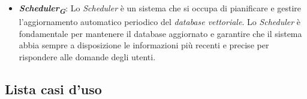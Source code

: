 \begin{itemize}
    \item \textbf{\emph{Scheduler}\textsubscript{\textbf{\textit{G}}}}: Lo \emph{Scheduler} è un sistema che si occupa di pianificare e gestire l'aggiornamento automatico periodico del \emph{database vettoriale}. Lo \emph{Scheduler} è fondamentale per mantenere il database aggiornato e garantire che il sistema abbia sempre a disposizione le informazioni più recenti e precise per rispondere alle domande degli utenti.

\end{itemize}


\subsection{Lista casi d'uso}





\begin{comment}
\hypertarget{UC0}{}
\subsubsection{UC0: \dots}

\begin{figure}[h]
    \centering
    \texttt{[image: placeholder.png]}
    \caption{\dots}
\end{figure}

\begin{itemize}
    \item \textbf{Attori principali}: \dots;
    \item \textbf{Precondizioni}: \dots;
    \item \textbf{Precondizioni}: 
    \begin{itemize}
        \item \dots;
        \item \dots.
    \end{itemize}
    \item \textbf{Trigger}: \dots;
    \item \textbf{Postcondizioni}: \dots;
    \item \textbf{Scenario principale}:
    \begin{enumerate}
        \item \dots;
        \item \dots.
    \end{enumerate}
    \item \textbf{Sottocasi d'uso}:
    \begin{itemize}
        \item \dots;
        \item \dots.
    \end{itemize}
    \item \textbf{Scenario alternativo}:
    \begin{enumerate}
        \item \dots;
        \item \dots.
    \end{enumerate}
\end{itemize}
\end{comment}




